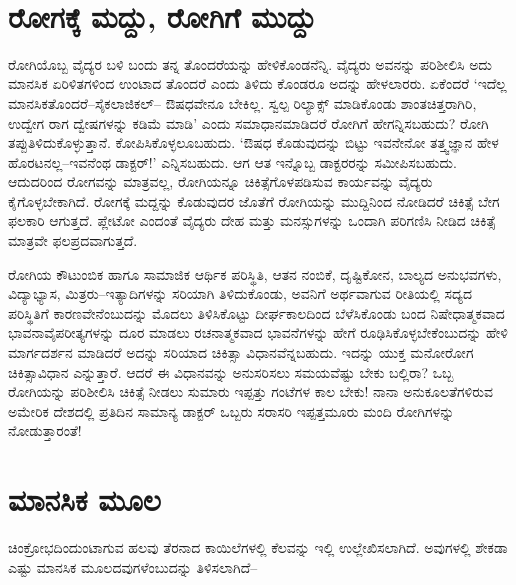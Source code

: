 ~\\[-1cm]


\section*{ರೋಗಕ್ಕೆ ಮದ್ದು, ರೋಗಿಗೆ ಮುದ್ದು}


ರೋಗಿಯೊಬ್ಬ ವೈದ್ಯರ ಬಳಿ ಬಂದು ತನ್ನ ತೊಂದರೆಯನ್ನು ಹೇಳಿಕೊಂಡನೆನ್ನಿ. ವೈದ್ಯರು ಅವನನ್ನು ಪರಿಶೀಲಿಸಿ ಅದು ಮಾನಸಿಕ ಏರಿಳಿತಗಳಿಂದ ಉಂಟಾದ ತೊಂದರೆ ಎಂದು ತಿಳಿದು ಕೊಂಡರೂ ಅದನ್ನು ಹೇಳಲಾರರು. ಏಕೆಂದರೆ ‘ಇದೆಲ್ಲ ಮಾನಸಿಕತೊಂದರೆ–ಸೈಕಲಾಜಿಕಲ್​– ಔಷಧವೇನೂ ಬೇಕಿಲ್ಲ. ಸ್ವಲ್ಪ ರಿಲ್ಯಾಕ್ಸ್ ಮಾಡಿಕೊಂಡು ಶಾಂತಚಿತ್ತರಾಗಿರಿ, ಉದ್ವೇಗ ರಾಗ ದ್ವೇಷಗಳನ್ನು ಕಡಿಮೆ ಮಾಡಿ’ ಎಂದು ಸಮಾಧಾನಮಾಡಿದರೆ ರೋಗಿಗೆ ಹೇಗನ್ನಿಸಬಹುದು? ರೋಗಿ ತಪ್ಪುತಿಳಿದುಕೊಳ್ಳುತ್ತಾನೆ. ಕೋಪಿಸಿಕೊಳ್ಳಲೂಬಹುದು. ‘ಔಷಧ ಕೊಡುವುದನ್ನು ಬಿಟ್ಟು ಇವನೇನೋ ತತ್ತ್ವಜ್ಞಾನ ಹೇಳ ಹೊರಟನಲ್ಲ–ಇವನೆಂಥ ಡಾಕ್ಟರ್​!’ ಎನ್ನಿಸಬಹುದು. ಆಗ ಆತ ಇನ್ನೊಬ್ಬ ಡಾಕ್ಟರರನ್ನು ಸಮೀಪಿಸಬಹುದು. ಆದುದರಿಂದ ರೋಗವನ್ನು ಮಾತ್ರವಲ್ಲ, ರೋಗಿಯನ್ನೂ ಚಿಕಿತ್ಸೆಗೊಳಪಡಿಸುವ ಕಾರ್ಯವನ್ನು ವೈದ್ಯರು ಕೈಗೊಳ್ಳಬೇಕಾಗಿದೆ. ರೋಗಕ್ಕೆ ಮದ್ದನ್ನು ಕೊಡುವುದರ ಜೊತೆಗೆ ರೋಗಿಯನ್ನು ಮುದ್ದಿನಿಂದ ನೋಡಿದರೆ ಚಿಕಿತ್ಸೆ ಬೇಗ ಫಲಕಾರಿ ಆಗುತ್ತದೆ. ಪ್ಲೇಟೋ ಎಂದಂತೆ ವೈದ್ಯರು ದೇಹ ಮತ್ತು ಮನಸ್ಸುಗಳನ್ನು ಒಂದಾಗಿ ಪರಿಗಣಿಸಿ ನೀಡಿದ ಚಿಕಿತ್ಸೆ ಮಾತ್ರವೇ ಫಲಪ್ರದವಾಗುತ್ತದೆ.

ರೋಗಿಯ ಕೌಟುಂಬಿಕ ಹಾಗೂ ಸಾಮಾಜಿಕ ಆರ್ಥಿಕ ಪರಿಸ್ಥಿತಿ, ಆತನ ನಂಬಿಕೆ, ದೃಷ್ಟಿಕೋನ, ಬಾಲ್ಯದ ಅನುಭವಗಳು, ವಿದ್ಯಾಭ್ಯಾಸ, ಮಿತ್ರರು–ಇತ್ಯಾದಿಗಳನ್ನು ಸರಿಯಾಗಿ ತಿಳಿದುಕೊಂಡು, ಅವನಿಗೆ ಅರ್ಥವಾಗುವ ರೀತಿಯಲ್ಲಿ ಸದ್ಯದ ಪರಿಸ್ಥಿತಿಗೆ ಕಾರಣವೇನೆಂಬುದನ್ನು ಮೊದಲು ತಿಳಿಸಿ\-ಕೊಟ್ಟು ದೀರ್ಘಕಾಲದಿಂದ ಬೆಳೆಸಿಕೊಂಡು ಬಂದ ನಿಷೇಧಾತ್ಮಕವಾದ ಭಾವನಾವೈಪರೀತ್ಯಗಳನ್ನು ದೂರ ಮಾಡಲು ರಚನಾತ್ಮಕವಾದ ಭಾವನೆಗಳನ್ನು ಹೇಗೆ ರೂಢಿಸಿಕೊಳ್ಳಬೇಕೆಂಬುದನ್ನು ಹೇಳಿ ಮಾರ್ಗದರ್ಶನ ಮಾಡಿದರೆ ಅದನ್ನು ಸರಿಯಾದ ಚಿಕಿತ್ಸಾ ವಿಧಾನವೆನ್ನಬಹುದು. ಇದನ್ನು ಯುಕ್ತ ಮನೋರೋಗ ಚಿಕಿತ್ಸಾವಿಧಾನ  ಎನ್ನುತ್ತಾರೆ. ಆದರೆ ಈ ವಿಧಾನವನ್ನು ಅನುಸರಿಸಲು ಸಮಯವೆಷ್ಟು ಬೇಕು ಬಲ್ಲಿರಾ? ಒಬ್ಬ ರೋಗಿಯನ್ನು ಪರಿಶೀಲಿಸಿ ಚಿಕಿತ್ಸೆ ನೀಡಲು ಸುಮಾರು ಇಪ್ಪತ್ತು ಗಂಟೆಗಳ ಕಾಲ ಬೇಕು! ನಾನಾ ಅನುಕೂಲತೆಗಳಿರುವ ಅಮೇರಿಕ ದೇಶದಲ್ಲಿ ಪ್ರತಿದಿನ ಸಾಮಾನ್ಯ ಡಾಕ್ಟರ್ ಒಬ್ಬರು ಸರಾಸರಿ ಇಪ್ಪತ್ತಮೂರು ಮಂದಿ ರೋಗಿಗಳನ್ನು ನೋಡುತ್ತಾರಂತೆ!


\section*{ಮಾನಸಿಕ ಮೂಲ}


ಚಿಂಕ್ರೋಭದಿಂದುಂಟಾಗುವ ಹಲವು ತೆರನಾದ ಕಾಯಿಲೆಗಳಲ್ಲಿ ಕೆಲವನ್ನು ಇಲ್ಲಿ ಉಲ್ಲೇಖಿಸಲಾಗಿದೆ. ಅವುಗಳಲ್ಲಿ ಶೇಕಡಾ ಎಷ್ಟು ಮಾನಸಿಕ ಮೂಲದವುಗಳೆಂಬುದನ್ನು ತಿಳಿಸಲಾಗಿದೆ–

